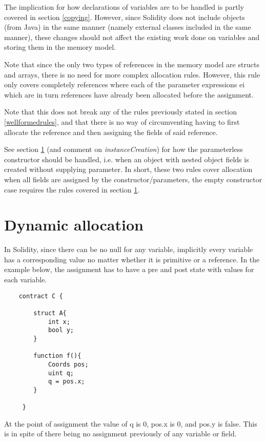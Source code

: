 \documentclass{article}
\begin{document}
	The implication for how declarations of variables are to be handled is partly covered in section \ref{copying}. However, since Solidity does not include objects (from Java) in the same manner (namely external classes included in the same manner), these changes should not affect the existing work done on variables and storing them in the memory model. 
	
	Note that since the only two types of references in the memory model are structs and arrays, there is no need for more complex allocation rules. However, this rule only covers completely references where each of the parameter expressions ei which are in turn references have already been allocated before the assignment. 
	
	Note that this does not break any of the rules previously stated in section \ref{wellformedrules}, and that there is no way of circumventing having to first allocate the reference and then assigning the fields of said reference. 
	
	See section \ref{dynamic} (and comment on \textit{instanceCreation}) for how the parameterless constructor should be handled, i.e. when an object with nested object fields is created without supplying parameter. In short, these two rules cover allocation when all fields are assigned by the constructor/parameters, the empty constructor case requires the rules covered in section \ref{dynamic}. 
	
	\section{Dynamic allocation} \label{dynamic}
	In Solidity, since there can be no null for any variable, implicitly every variable has a corresponding value no matter whether it is primitive or a reference. In the example below, the assignment has to have a pre and post state with values for each variable. 
	
	\begin{lstlisting}
	contract C {
	 		
		struct A{
	 		int x;
	 		bool y;
	 	}
	 		
	 	function f(){
	 		Coords pos;
	 		uint q;
	 		q = pos.x;
	 	}

	 }
	\end{lstlisting}
	
	At the point of assignment the value of q is 0, pos.x is 0, and pos.y is false. This is in spite of there being no assignment previously of any variable or field. 
	
\end{document}
